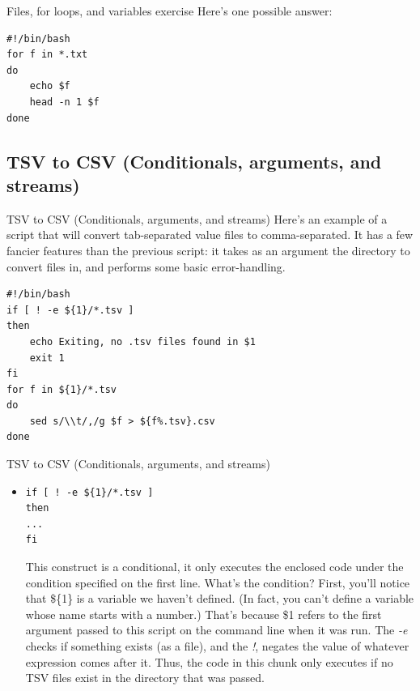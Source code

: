 \documentclass{beamer}
\begin{document}
\begin{frame}[fragile]{Files, for loops, and variables exercise}
Here's one possible answer:
\begin{lstlisting}[title=text\_preview.sh]
#!/bin/bash
for f in *.txt
do
    echo $f
    head -n 1 $f
done
\end{lstlisting}
\end{frame}

\subsection{TSV to CSV (Conditionals, arguments, and streams)}
\begin{frame}[fragile]{TSV to CSV (Conditionals, arguments, and streams)}
Here's an example of a script that will convert tab-separated value files to comma-separated. It has a few fancier features than the previous script: it takes as an argument the directory to convert files in, and performs some basic error-handling.
\begin{lstlisting}[title=tsv\_to\_csv.sh]
#!/bin/bash
if [ ! -e ${1}/*.tsv ]
then
    echo Exiting, no .tsv files found in $1
    exit 1
fi 
for f in ${1}/*.tsv
do
    sed s/\\t/,/g $f > ${f%.tsv}.csv
done
\end{lstlisting}
\end{frame}


\begin{frame}[fragile]{TSV to CSV (Conditionals, arguments, and streams)}
\begin{itemize}
\item<1->
\begin{lstlisting}
if [ ! -e ${1}/*.tsv ]
then
...
fi
\end{lstlisting} 
This construct is a conditional, it only executes the enclosed code under the condition specified on the first line. What's the condition? First, you'll notice that \$\{1\} is a variable we haven't defined. (In fact, you can't define a variable whose name starts with a number.) That's because \$1 refers to the first argument passed to this script on the command line when it was run. The \emph{-e} checks if something exists (as a file), and the \emph{!}, negates the value of whatever expression comes after it. Thus, the code in this chunk only executes if no TSV files exist in the directory that was passed.
\end{itemize}
\end{frame}
\end{document}
